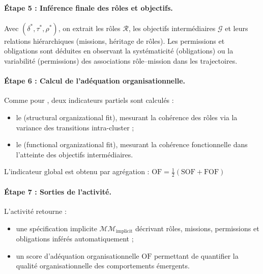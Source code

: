 \paragraph{Étape 5 : Inférence finale des rôles et objectifs.}
Avec $(\delta^*, \tau^*, \rho^*)$, on extrait les rôles $\mathcal{R}$, les objectifs intermédiaires $\mathcal{G}$ et leurs relations hiérarchiques (missions, héritage de rôles).
Les permissions et obligations sont déduites en observant la systématicité (obligations) ou la variabilité (permissions) des associations rôle–mission dans les trajectoires.

\paragraph{Étape 6 : Calcul de l'adéquation organisationnelle.}
Comme pour , deux indicateurs partiels sont calculés :
\begin{itemize}
  \item le \textbf{} (structural organizational fit), mesurant la cohérence des rôles via la variance des transitions intra-cluster ;
  \item le \textbf{} (functional organizational fit), mesurant la cohérence fonctionnelle dans l'atteinte des objectifs intermédiaires.
\end{itemize}
L'indicateur global est obtenu par agrégation :
$\text{OF} = \frac{1}{2}(\text{SOF} + \text{FOF})$

\paragraph{Étape 7 : Sorties de l'activité.}
L'activité retourne :
\begin{itemize}
  \item une spécification implicite $\mathcal{MM}_{\text{implicit}}$ décrivant rôles, missions, permissions et obligations inférés automatiquement ;
  \item un score d'adéquation organisationnelle $\text{OF}$ permettant de quantifier la qualité organisationnelle des comportements émergents.
\end{itemize}


